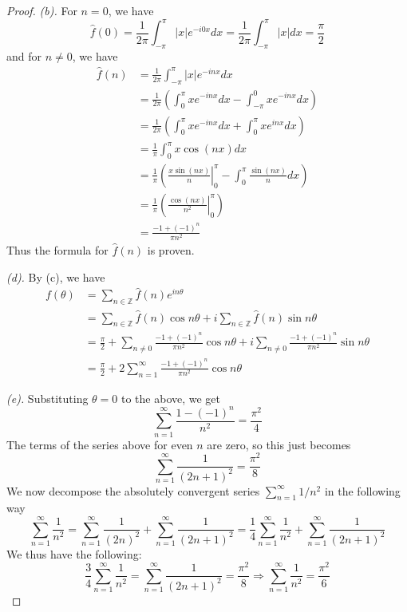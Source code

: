 \documentclass{article}
\newcommand{\longimplies}{\Longrightarrow}
\theoremstyle{definition} %
\numberwithin{thm}{section} %
\theoremstyle{definition} %
\begin{document}
\begin{proof}
\textit{(b).} For $n = 0$, we have
\[
    \hat{f}(0) = \frac{1}{2\pi}\int_{-\pi}^\pi |x|e^{-i0x}dx
    = \frac{1}{2\pi}\int_{-\pi}^\pi |x|dx
    = \frac{\pi}{2}
\]
and for $n \neq 0$, we have
\begin{align*}
    \hat{f}(n)
    &= \frac{1}{2\pi}\int_{-\pi}^\pi |x|e^{-inx}dx \\
    &= \frac{1}{2\pi}\left(\int_{0}^\pi xe^{-inx}dx - 
    \int_{-\pi}^0 xe^{-inx}dx\right) \\
    &= \frac{1}{2\pi}\left(\int_{0}^\pi xe^{-inx}dx + 
    \int_0^\pi xe^{inx}dx\right) \\
    &= \frac{1}{\pi}\int_0^\pi x\cos(nx) dx \\
    &= \frac{1}{\pi}\left(\left.\frac{x\sin(nx)}{n}\right|_0^\pi 
    - \int_0^\pi \frac{\sin(nx)}{n}dx\right) \\
    &= \frac{1}{\pi}\left(\left.\frac{\cos(nx)}{n^2}\right|_0^\pi\right) \\
    &= \frac{-1 + (-1)^n}{\pi n^2}
\end{align*}
Thus the formula for $\hat{f}(n)$ is proven.

\textit{(d).} By (c), we have
\begin{align*}
    f(\theta) 
    &= \sum_{n \in \mathbb{Z}} \hat{f}(n) e^{in\theta} \\
    &= \sum_{n \in \mathbb{Z}} \hat{f}(n) \cos n\theta +
    i\sum_{n \in \mathbb{Z}} \hat{f}(n)\sin n\theta \\
    &= \frac{\pi}{2} + \sum_{n \neq 0} 
    \frac{-1 + (-1)^n}{\pi n^2}\cos n\theta +
    i\sum_{n \neq 0} \frac{-1 + (-1)^n}{\pi n^2}\sin n\theta \\
    &= \frac{\pi}{2} 
    + 2\sum_{n = 1}^\infty \frac{-1 + (-1)^n}{\pi n^2}\cos n\theta
\end{align*}

\textit{(e).} Substituting $\theta = 0$ to the above, we get
\[
    \sum_{n = 1}^\infty \frac{1 - (-1)^n}{n^2} = \frac{\pi^2}{4}
\]
The terms of the series above for even $n$ are zero, so this just becomes
\[
    \sum_{n = 1}^\infty \frac{1}{(2n + 1)^2} = \frac{\pi^2}{8}
\]
We now decompose the absolutely convergent series 
$\sum_{n = 1}^\infty 1/n^2$ in the following way
\[
    \sum_{n = 1}^\infty \frac{1}{n^2} = 
    \sum_{n = 1}^\infty \frac{1}{(2n)^2} 
    + \sum_{n = 1}^\infty \frac{1}{(2n + 1)^2} 
    = \frac{1}{4}\sum_{n = 1}^\infty \frac{1}{n^2} 
    + \sum_{n = 1}^\infty \frac{1}{(2n + 1)^2}
\]
We thus have the following:
\[
    \frac{3}{4}\sum_{n = 1}^\infty \frac{1}{n^2} 
    = \sum_{n = 1}^\infty \frac{1}{(2n + 1)^2} = \frac{\pi^2}{8}
    \longimplies \sum_{n = 1}^\infty \frac{1}{n^2} = \frac{\pi^2}{6}
\]
\end{proof}
\end{document}
